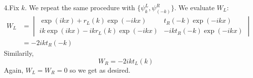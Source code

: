 \begin{mystsolution}
4.Fix $k$. We repeat the same procedure with $\{\psi_k^L,\psi_{( -k)}^R\}$. We evaluate $W_L$:
\begin{equation}
\begin{aligned}
W_L &= \begin{vmatrix}
\exp(ikx)+r_L(k)\exp(-ikx) & t_R(-k)\exp(-ikx) \\
ik\exp(ikx)-ikr_L(k)\exp(-ikx) & -ikt_R(-k)\exp(-ikx)
\end{vmatrix} \\
&= -2ikt_R(-k)
\end{aligned}
\end{equation}
Similarily,
\begin{equation}
W_R = -2ikt_L(k)
\end{equation}
Again, $W_L=W_R=0$ so we get as desired.

\end{mystsolution}
